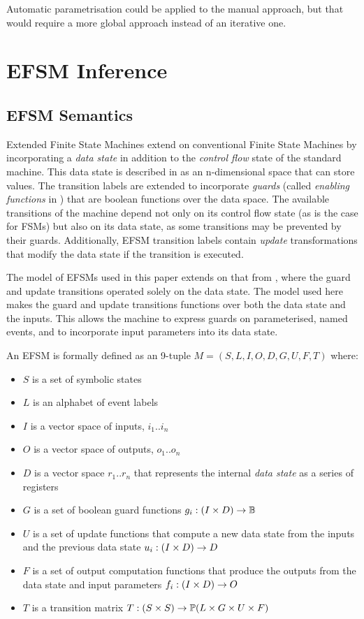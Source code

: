 Automatic parametrisation could be applied to the manual approach, but that 
would require a more global approach instead of an iterative one.

\section{EFSM Inference}
\label{EFSMInference}

\subsection{EFSM Semantics}
\label{EFSMSemantics}

Extended Finite State Machines extend on conventional Finite State Machines by incorporating a \emph{data state} in addition to the \emph{control flow} state of the standard machine. This data state is described in \cite{EFSMs} as an n-dimensional space that can store values. The transition labels are extended to incorporate \emph{guards} (called \emph{enabling functions} in \cite{EFSMs}) that are boolean functions over the data space. The available transitions of the machine depend not only on its control flow state (as is the case for FSMs) but also on its data state, as some transitions may be prevented by their guards. Additionally, EFSM transition labels contain \emph{update} transformations that modify the data state if the transition is executed. 

The model of EFSMs used in this paper extends on that from \cite{EFSMs}, where the guard and update transitions operated solely on the data state. The model used here makes the guard and update transitions functions over both the data state and the inputs. This allows the machine to express guards on parameterised, named events, and to incorporate input parameters into its data state.
  
An EFSM is formally defined as an 9-tuple $M = (S,L,I,O,D,G,U,F,T)$ where:

\begin{itemize}
\item{$S$ is a set of symbolic states}
\item{$L$ is an alphabet of event labels}
\item{$I$ is a vector space of inputs, $i_{1} .. i_{n}$}
\item{$O$ is a vector space of outputs, $o_{1} .. o_{n}$}
\item{$D$ is a vector space $r_{1} .. r_{n}$ that represents the internal \emph{data state} as a series of registers}
\item{$G$ is a set of boolean guard functions $g_{i} : (I \times D) \rightarrow {\mathbb B}$}
\item{$U$ is a set of update functions that compute a new data state from the inputs and the previous data state $u_{i} : (I \times D) \rightarrow D$}
\item{$F$ is a set of output computation functions that produce the outputs from the data state and input parameters $f_{i} : (I \times D) \rightarrow O$}
\item{$T$ is a transition matrix $T : (S \times S) \rightarrow \mathbb P (L \times G \times U \times F)$}
\end{itemize}

